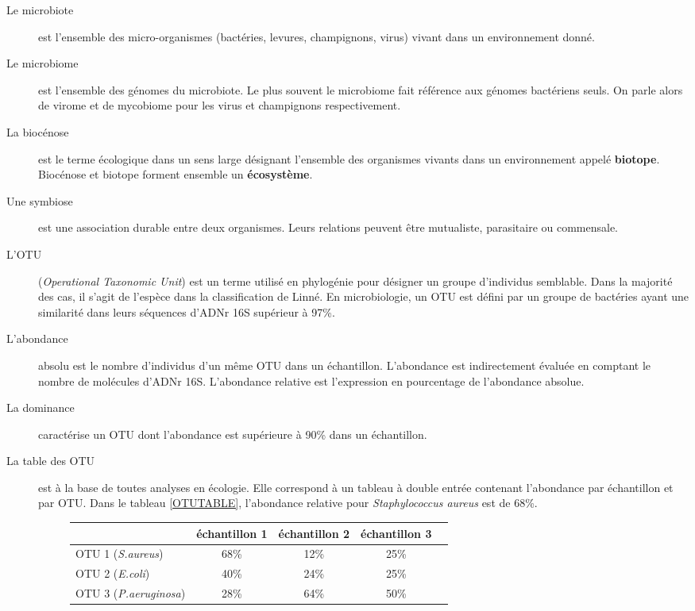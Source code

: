 \documentclass[12pt,a4paper]{article}
\begin{document}
\begin{description}
\item[Le microbiote\cite{Eisen} ]est l’ensemble des micro-organismes (bactéries, levures, champignons, virus) vivant dans un environnement donné.
  
\item[Le microbiome\cite{Eisen}] est l'ensemble des génomes du microbiote. Le plus souvent le microbiome fait référence aux génomes bactériens seuls. On parle alors de virome et de mycobiome pour les virus et champignons respectivement.

\item[La biocénose] est le terme écologique dans un sens large désignant l'ensemble des organismes vivants dans un environnement appelé \textbf{biotope}. Biocénose et biotope forment ensemble un \textbf{écosystème}.

\item[Une symbiose] est une association durable entre deux organismes. Leurs relations peuvent être mutualiste, parasitaire ou commensale.


\item[L'OTU] (\textit{Operational Taxonomic Unit}) est un terme utilisé en phylogénie pour désigner un groupe d’individus semblable. Dans la majorité des cas, il s'agit de l'espèce dans la classification de Linné.
En microbiologie, un OTU est défini par un groupe de bactéries ayant une similarité dans leurs séquences d'ADNr 16S supérieur à 97\%.

\item[L'abondance] absolu est le nombre d'individus d'un même OTU dans un échantillon. L'abondance est indirectement évaluée en comptant le nombre de molécules d'ADNr 16S. 
L’abondance relative est l'expression en pourcentage de l'abondance absolue.

\item[La dominance] caractérise un OTU dont l'abondance est supérieure à 90\% dans un échantillon.


\item[La table des OTU] est à la base de toutes analyses en écologie. Elle correspond à un tableau à double entrée contenant l’abondance par échantillon et par OTU. Dans le tableau \ref{OTUTABLE}, l'abondance relative pour \textit{Staphylococcus aureus} est de 68\%.

\begin{figure}[h]
\begin{center}
\begin{tabular}{|l|c|c|c|c}
  \hline
   & échantillon 1 & échantillon 2 & échantillon 3  \\
  \hline
  OTU 1 (\textit{S.aureus}) & 68\% & 12\% & 25\% \\
  OTU 2 (\textit{E.coli})& 40\% & 24\% & 25\% \\
  OTU 3 (\textit{P.aeruginosa}) & 28\% & 64\% & 50\% \\


\end{tabular}
\end{center}
\end{figure}
\end{description}
\end{document}
